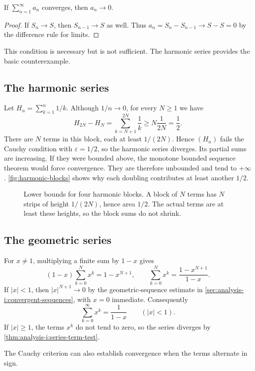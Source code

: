 \begin{proposition}
  \label{thm:analysis-i:series-term-test}
  If $\sum_{n=1}^{\infty}a_n$ converges, then $a_n\to0$.
\end{proposition}

\begin{proof}
  If $S_n\to S$, then $S_{n-1}\to S$ as well. Thus
  $a_n=S_n-S_{n-1}\to S-S=0$ by the difference rule for limits.
\end{proof}

This condition is necessary but is not sufficient. The harmonic series
provides the basic counterexample.

\subsection{The harmonic series}

Let $H_n=\sum_{k=1}^n1/k$. Although $1/n\to0$, for every $N\ge1$
we have
\[
  H_{2N}-H_N=\sum_{k=N+1}^{2N}\frac1k
  \ge N\frac{1}{2N}=\frac12.
\]
There are $N$ terms in this block, each at least $1/(2N)$.
Hence $(H_n)$ fails the Cauchy condition with $\varepsilon=1/2$,
so the harmonic series diverges. Its partial sums are increasing.
If they were bounded above, the monotone bounded sequence theorem
would force convergence. They are therefore unbounded and tend to
$+\infty$. \autoref{fig:harmonic-blocks} shows why each doubling
contributes at least another $1/2$.

\begin{figure}[htbp]
  \centering
  
  \caption[Harmonic blocks with a constant lower bound.]{Lower bounds for four harmonic blocks. A block of $N$ terms
    has $N$ strips of height $1/(2N)$, hence area $1/2$. The actual
    terms are at least these heights, so the block sums do not shrink.}
  \label{fig:harmonic-blocks}
\end{figure}

\subsection{The geometric series}

For $x\ne1$, multiplying a finite sum by $1-x$ gives
\[
  (1-x)\sum_{k=0}^N x^k=1-x^{N+1},\qquad
  \sum_{k=0}^N x^k=\frac{1-x^{N+1}}{1-x}.
\]
If $|x|<1$, then $|x|^{N+1}\to0$ by the geometric-sequence
estimate in \autoref{sec:analysis-i:convergent-sequences}, with
$x=0$ immediate. Consequently
\[
  \sum_{k=0}^{\infty}x^k=\frac{1}{1-x}\qquad(|x|<1).
\]
If $|x|\ge1$, the terms $x^k$ do not tend to zero, so the series
diverges by \autoref{thm:analysis-i:series-term-test}.

The Cauchy criterion can also establish convergence when the terms
alternate in sign.


